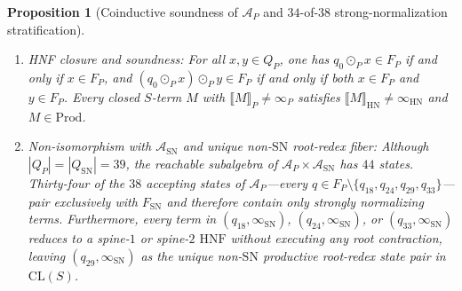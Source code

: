 \documentclass[11pt,reqno]{amsart}
\numberwithin{equation}{section}
\theoremstyle{plain}
\newtheorem{proposition}[theorem]{Proposition}
\theoremstyle{definition}
\theoremstyle{remark}
\newcommand{\CLS}{\mathrm{CL}(S)}
\newcommand{\HNF}{\mathrm{HNF}}
\newcommand{\SN}{\mathrm{SN}}
\newcommand{\HN}{\mathrm{HN}}
\newcommand{\Prod}{\mathrm{Prod}}
\newcommand{\sem}[1]{\llbracket #1 \rrbracket}
\begin{document}
\begin{proposition}[Coinductive soundness of $\mathcal{A}_P$ and $34$-of-$38$ strong-normalization stratification]\label{prop:ap-soundness-stratification}
\begin{enumerate}[label=(\roman*),leftmargin=2.2em]
  \item \emph{HNF closure and soundness:} For all $x, y \in Q_P$, one has $q_0 \odot_P x \in F_P$ if and only if $x \in F_P$, and $(q_0 \odot_P x) \odot_P y \in F_P$ if and only if both $x \in F_P$ and $y \in F_P$. Every closed $S$-term $M$ with $\sem{M}_P \neq \infty_P$ satisfies $\sem{M}_{\HN} \neq \infty_{\HN}$ and $M \in \Prod$.
  \item \emph{Non-isomorphism with $\mathcal{A}_{\SN}$ and unique non-$\SN$ root-redex fiber:} Although $|Q_P| = |Q_{\SN}| = 39$, the reachable subalgebra of $\mathcal{A}_P \times \mathcal{A}_{\SN}$ has $44$ states. Thirty-four of the $38$ accepting states of $\mathcal{A}_P$---every $q \in F_P \setminus \{q_{18}, q_{24}, q_{29}, q_{33}\}$---pair exclusively with $F_{\SN}$ and therefore contain only strongly normalizing terms. Furthermore, every term in $(q_{18}, \infty_{\SN})$, $(q_{24}, \infty_{\SN})$, or $(q_{33}, \infty_{\SN})$ reduces to a spine-$1$ or spine-$2$ $\HNF$ without executing any root contraction, leaving $(q_{29}, \infty_{\SN})$ as the unique non-$\SN$ productive root-redex state pair in $\CLS$.
\end{enumerate}
\end{proposition}
\end{document}

